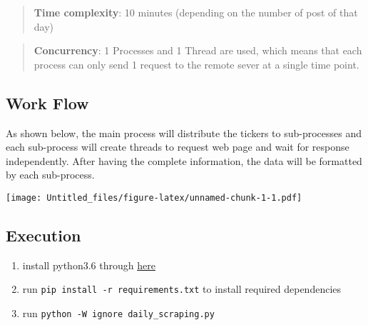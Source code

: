 \documentclass[]{article}
\providecommand{\tightlist}{%
  \setlength{\itemsep}{0pt}\setlength{\parskip}{0pt}}
\begin{document}
\begin{quote}
\textbf{Time complexity}: 10 minutes (depending on the number of post of
that day)
\end{quote}

\begin{quote}
\textbf{Concurrency}: 1 Processes and 1 Thread are used, which means
that each process can only send 1 request to the remote sever at a
single time point.
\end{quote}

\newpage

\hypertarget{work-flow}{%
\subsection{Work Flow}\label{work-flow}}

As shown below, the main process will distribute the tickers to
sub-processes and each sub-process will create threads to request web
page and wait for response independently. After having the complete
information, the data will be formatted by each sub-process.

\texttt{[image: Untitled\_files/figure-latex/unnamed-chunk-1-1.pdf]}

\hypertarget{execution}{%
\subsection{Execution}\label{execution}}

\begin{enumerate}
\def\labelenumi{\arabic{enumi}.}
\tightlist
\item
  install python3.6 through
  \href{https://www.python.org/downloads/release/python-368/}{here}
\item
  run \texttt{pip\ install\ -r\ requirements.txt} to install required
  dependencies
\item
  run \texttt{python\ -W\ ignore\ daily\_scraping.py}
\end{enumerate}
\end{document}
